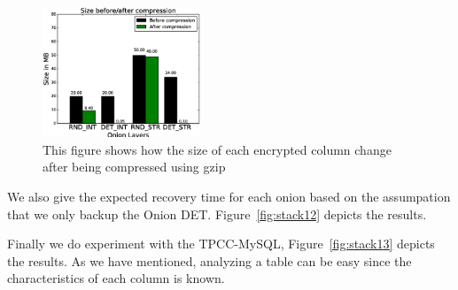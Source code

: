


\begin{figure}   
  \begin{minipage}[t]{0.5\linewidth}  
    \centering   
    \includegraphics[width=4.7cm]{images/aftercompression.eps}   
    \caption{\small{This figure shows how the size of each encrypted column change after being compressed using gzip}} 
    \label{fig:side:a}   
  \end{minipage}%
\end{figure}





We also give the expected recovery time for each onion based on the assumpation that we only backup the Onion DET. Figure~\ref{fig:stack12} depicts the results.


Finally we do experiment with the TPCC-MySQL, Figure~\ref{fig:stack13} depicts the results. As we have mentioned, analyzing a table can be easy since the characteristics of each column is known. 






